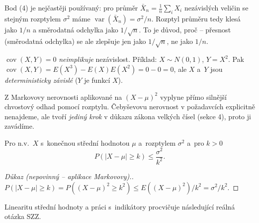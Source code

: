 \documentclass[11pt,a4paper]{article}
\DeclareMathOperator{\Var}{var}
\DeclareMathOperator{\Cov}{cov}
\begin{document}
\begin{intuice}
Bod (4) je nejčastěji používaný: pro průměr $\bar X_n=\tfrac1n\sum_i X_i$ nezávislých veličin se stejným rozptylem $\sigma^2$ máme $\Var(\bar X_n)=\sigma^2/n$. Rozptyl průměru tedy klesá jako $1/n$ a směrodatná odchylka jako $1/\sqrt{n}$. To je důvod, proč  -- přesnost (směrodatná odchylka) se ale zlepšuje jen jako $1/\sqrt n$, ne jako $1/n$.
\end{intuice}

\begin{poznamka}
$\Cov(X,Y)=0$ \emph{neimplikuje} nezávislost. Příklad: $X\sim N(0,1)$, $Y=X^2$. Pak $\Cov(X,Y)=E(X^3)-E(X)E(X^2)=0-0=0$, ale $X$ a~$Y$ jsou \emph{deterministicky závislé} ($Y$ je funkcí $X$).
\end{poznamka}

\noindent Z Markovovy nerovnosti aplikované na $(X-\mu)^2$ vyplyne přímo silnější chvostový odhad pomocí rozptylu. Čebyševovu nerovnost v požadavcích explicitně nenajdeme, ale tvoří \emph{jediný krok} v důkazu zákona velkých čísel (sekce 4), proto ji zavádíme.

\begin{veta}
Pro n.v.\ $X$ s~konečnou střední hodnotou $\mu$ a~rozptylem $\sigma^2$ a~pro $k>0$
\[
P(|X-\mu|\ge k)\le\frac{\sigma^2}{k^2}.
\]
\end{veta}

\begin{proof}[Důkaz \textnormal{(nepovinný -- aplikace Markovovy).}]
$P(|X-\mu|\ge k)=P((X-\mu)^2\ge k^2)\le E((X-\mu)^2)/k^2=\sigma^2/k^2$.
\end{proof}

\noindent Linearitu střední hodnoty a práci s~indikátory procvičuje následující reálná otázka SZZ.
\end{document}
